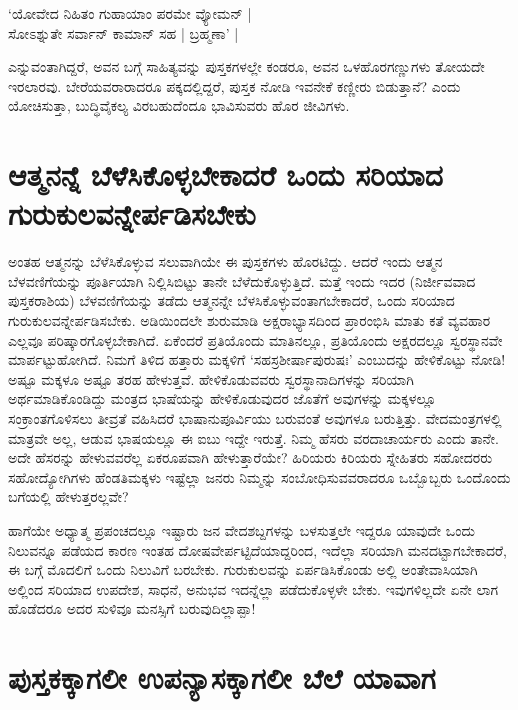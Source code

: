 \begin{shloka}
`ಯೋವೇದ ನಿಹಿತಂ ಗುಹಾಯಾಂ ಪರಮೇ ವ್ಯೋಮನ್ |\\
ಸೋಽಶ್ನುತೇ ಸರ್ವಾನ್ ಕಾಮಾನ್ ಸಹ | ಬ್ರಹ್ಮಣಾ' |
\end{shloka}
ಎನ್ನುವಂತಾಗಿದ್ದರೆ, ಅವನ ಬಗ್ಗೆ ಸಾಹಿತ್ಯವನ್ನು ಪುಸ್ತಕಗಳಲ್ಲೇ ಕಂಡರೂ, ಅವನ ಒಳಹೊರಗಣ್ಣುಗಳು ತೋಯದೇ ಇರಲಾರವು. ಬೇರೆಯವರಾರಾದರೂ ಪಕ್ಕದಲ್ಲಿದ್ದರೆ, ಪುಸ್ತಕ ನೋಡಿ ಇವನೇಕೆ ಕಣ್ಣೀರು ಬಿಡುತ್ತಾನೆ? ಎಂದು ಯೋಚಿಸುತ್ತಾ, ಬುದ್ಧಿವೈಕಲ್ಯ ವಿರಬಹುದೆಂದೂ ಭಾವಿಸುವರು ಹೊರ ಜೀವಿಗಳು.

\section*{ಆತ್ಮನನ್ನೆ ಬೆಳೆಸಿಕೊಳ್ಳಬೇಕಾದರೆ ಒಂದು ಸರಿಯಾದ ಗುರುಕುಲವನ್ನೇರ್ಪಡಿಸಬೇಕು}

ಅಂತಹ ಆತ್ಮನನ್ನು ಬೆಳೆಸಿಕೊಳ್ಳುವ ಸಲುವಾಗಿಯೇ ಈ ಪುಸ್ತಕಗಳು ಹೊರಟಿದ್ದು. ಆದರೆ ಇಂದು ಆತ್ಮನ ಬೆಳವಣಿಗೆಯನ್ನು ಪೂರ್ತಿಯಾಗಿ ನಿಲ್ಲಿಸಿಬಿಟ್ಟು ತಾನೇ ಬೆಳೆದುಕೊಳ್ಳುತ್ತಿದೆ. ಮತ್ತೆ ಇಂದು ಇದರ (ನಿರ್ಜೀವವಾದ ಪುಸ್ತಕರಾಶಿಯ) ಬೆಳವಣಿಗೆಯನ್ನು ತಡೆದು ಆತ್ಮನನ್ನೇ ಬೆಳಸಿಕೊಳ್ಳುವಂತಾಗಬೇಕಾದರೆ, ಒಂದು ಸರಿಯಾದ ಗುರುಕುಲವನ್ನೇರ್ಪಡಿಸಬೇಕು. ಅಡಿಯಿಂದಲೇ ಶುರುಮಾಡಿ ಅಕ್ಷರಾಭ್ಯಾಸದಿಂದ ಪ್ರಾರಂಭಿಸಿ ಮಾತು ಕತೆ ವ್ಯವಹಾರ ಎಲ್ಲವೂ ಪರಿಷ್ಕಾರಗೊಳ್ಳಬೇಕಾಗಿದೆ. ಏಕೆಂದರೆ ಪ್ರತಿಯೊಂದು ಮಾತಿನಲ್ಲೂ, ಪ್ರತಿಯೊಂದು ಅಕ್ಷರದಲ್ಲೂ ಸ್ವರಸ್ಥಾನವೇ ಮಾರ್ಪಟ್ಟುಹೋಗಿದೆ. ನಿಮಗೆ ತಿಳಿದ ಹತ್ತಾರು ಮಕ್ಕಳಿಗೆ `ಸಹಸ್ರಶೀರ್ಷಾಪುರುಷಃ' ಎಂಬುದನ್ನು ಹೇಳಿಕೊಟ್ಟು ನೋಡಿ! ಅಷ್ಟೂ ಮಕ್ಕಳೂ ಅಷ್ಟೂ ತರಹ ಹೇಳುತ್ತವೆ. ಹೇಳಿಕೊಡುವವರು ಸ್ವರಸ್ಥಾನಾದಿಗಳನ್ನು ಸರಿಯಾಗಿ ಅರ್ಥಮಾಡಿಕೊಂಡಿದ್ದು ಮಂತ್ರದ ಭಾಷೆಯನ್ನು ಹೇಳಿಕೊಡುವುದರ ಜೊತೆಗೆ ಅವುಗಳನ್ನು ಮಕ್ಕಳಲ್ಲೂ ಸಂಕ್ರಾಂತಗೊಳಿಸಲು ತೀವ್ರತೆ ವಹಿಸಿದರೆ ಭಾಷಾನುಪೂರ್ವಿಯು ಬರುವಂತೆ ಅವುಗಳೂ ಬರುತ್ತಿತ್ತು. ವೇದಮಂತ್ರಗಳಲ್ಲಿ ಮಾತ್ರವೇ ಅಲ್ಲ, ಆಡುವ ಭಾಷಯಲ್ಲೂ ಈ ಐಬು ಇದ್ದೇ ಇರುತ್ತೆ. ನಿಮ್ಮ ಹೆಸರು ವರದಾಚಾರ್ಯರು ಎಂದು ತಾನೇ. ಅದೇ ಹೆಸರನ್ನು ಹೇಳುವವರೆಲ್ಲ ಏಕರೂಪವಾಗಿ ಹೇಳುತ್ತಾರೆಯೇ? ಹಿರಿಯರು ಕಿರಿಯರು ಸ್ನೇಹಿತರು ಸಹೋದರರು ಸಹೋದ್ಯೋಗಿಗಳು ಹೆಂಡತಿಮಕ್ಕಳು ಇಷ್ಟೆಲ್ಲಾ ಜನರು ನಿಮ್ಮನ್ನು ಸಂಬೋಧಿಸುವವರಾದರೂ ಒಬ್ಬೊಬ್ಬರು ಒಂದೊಂದು ಬಗೆಯಲ್ಲಿ ಹೇಳುತ್ತರಲ್ಲವೇ?

ಹಾಗೆಯೇ ಅಧ್ಯಾತ್ಮ  ಪ್ರಪಂಚದಲ್ಲೂ ಇಷ್ಟಾರು ಜನ ವೇದಶಬ್ದಗಳನ್ನು ಬಳಸುತ್ತಲೇ ಇದ್ದರೂ ಯಾವುದೇ ಒಂದು ನಿಲುವನ್ನೂ ಪಡೆಯದ ಕಾರಣ ಇಂತಹ ದೋಷವೇರ್ಪಟ್ಟಿದೆಯಾದ್ದರಿಂದ, ಇದೆಲ್ಲಾ ಸರಿಯಾಗಿ ಮನದಟ್ಟಾಗಬೇಕಾದರೆ, ಈ ಬಗ್ಗೆ ಮೊದಲಿಗೆ ಒಂದು ನಿಲುವಿಗೆ ಬರಬೇಕು. ಗುರುಕುಲವನ್ನು ಏರ್ಪಡಿಸಿಕೊಂಡು ಅಲ್ಲಿ ಅಂತೇವಾಸಿಯಾಗಿ ಅಲ್ಲಿಂದ ಸರಿಯಾದ ಉಪದೇಶ, ಸಾಧನೆ, ಅನುಭವ ಇದನ್ನೆಲ್ಲಾ ಪಡೆದುಕೊಳ್ಳಳೇ ಬೇಕು. ಇವುಗಳಿಲ್ಲದೇ ಏನೇ ಲಾಗ ಹೊಡೆದರೂ ಅದರ ಸುಳಿವೂ ಮನಸ್ಸಿಗೆ ಬರುವುದಿಲ್ಲಾಪ್ಪಾ!

\section*{ಪುಸ್ತಕಕ್ಕಾಗಲೀ ಉಪನ್ಯಾಸಕ್ಕಾಗಲೀ ಬೆಲೆ ಯಾವಾಗ}

